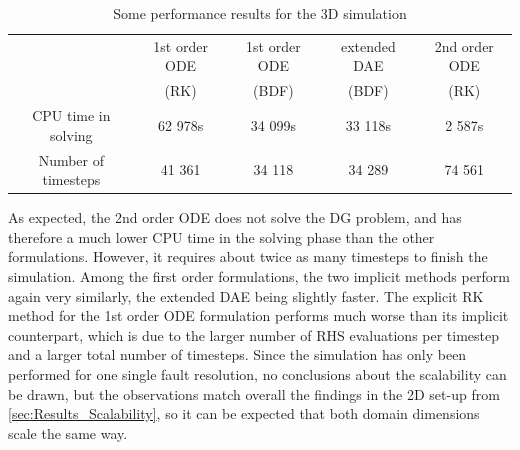\begin{table}[H]
	\centering 
	\begin{tabular}{ | c | c c c c |}
		\hline	
		& 1st order ODE 	& 1st order ODE 	& extended DAE  & 2nd order ODE  	\\ 
		& (RK)				& (BDF) 			&  (BDF) 		& (RK) 		  	 	\\ \hline
		CPU time in solving
		& 62 978s 			& 34 099s			& 33 118s 		& 2 587s			  	\\  
		Number of timesteps 	
		& 41 361 		 	& 34 118			& 34 289		& 74 561				\\\hline
	\end{tabular}
	\caption{Some performance results for the 3D simulation}
	\label{tab:performance_3D}
\end{table}

As expected, the 2nd order ODE does not solve the DG problem, and has therefore a much lower CPU time in the solving phase than the other formulations. However, it requires about twice as many timesteps to finish the simulation. Among the first order formulations, the two implicit methods perform again very similarly, the extended DAE being slightly faster. The explicit RK method for the 1st order ODE formulation performs much worse than its implicit counterpart, which is due to the larger number of RHS evaluations per timestep and a larger total number of timesteps. Since the simulation has only been performed for one single fault resolution, no conclusions about the scalability can be drawn, but the observations match overall the findings in the 2D set-up from \autoref{sec:Results_Scalability}, so it can be expected that both domain dimensions scale the same way. 






